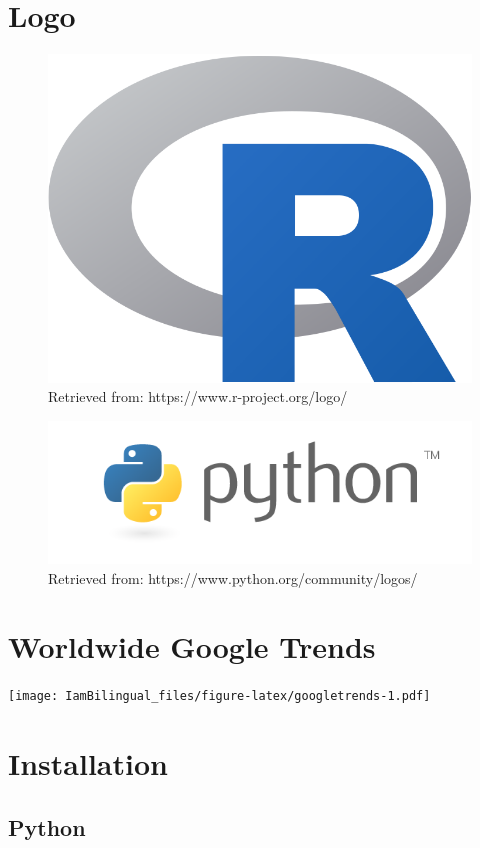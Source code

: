\documentclass[]{book}
\begin{document}
\hypertarget{logo}{%
\section{Logo}\label{logo}}

\begin{figure}

{\centering \includegraphics[width=0.3\linewidth]{fig/C1_Rlogo} 

}

\caption{Retrieved from: https://www.r-project.org/logo/}\label{fig:unnamed-chunk-1}
\end{figure}

\begin{figure}

{\centering \includegraphics[width=0.6\linewidth]{fig/C1_Pythonlogo} 

}

\caption{Retrieved from: https://www.python.org/community/logos/}\label{fig:unnamed-chunk-2}
\end{figure}

\hypertarget{worldwide-google-trends}{%
\section{Worldwide Google Trends}\label{worldwide-google-trends}}

\texttt{[image: IamBilingual\_files/figure-latex/googletrends-1.pdf]}

\hypertarget{installation}{%
\section{Installation}\label{installation}}

\hypertarget{python-3}{%
\subsection{Python}\label{python-3}}
\end{document}
